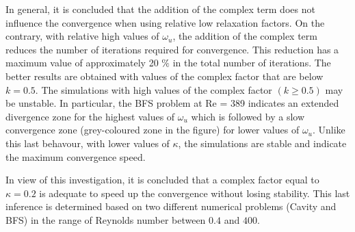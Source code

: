 \documentclass[final,3p,times,11pt,onecolumn]{myElsarticle}
\numberwithin{equation}{section}
\begin{document}
In general, it is concluded that the addition of the complex term does not influence the convergence when using relative low relaxation factors. On the contrary, with relative high values of $\omega_u$, the addition of the complex term reduces the number of iterations required for convergence. This reduction has a maximum value of approximately 20 $\%$ in the total number of iterations. The better results are obtained with values of the complex factor that are below $k = 0.5$. The simulations with high values of the complex factor $(k \geq 0.5)$ may be unstable. In particular, the BFS problem at Re = 389 indicates an extended divergence zone for the highest values of $\omega_u$ which is followed by a slow convergence zone (grey-coloured zone in the figure) for lower values of $\omega_u$. Unlike this last behavour, with lower values of $\kappa$, the simulations are stable and indicate the maximum convergence speed. 

In view of this investigation, it is concluded that a complex factor equal to $\kappa = 0.2$ is adequate to speed up the convergence without losing stability. This last inference is determined based on two different numerical problems (Cavity and BFS) in the range of Reynolds number between $0.4$ and $400$. 

 
\end{document}
